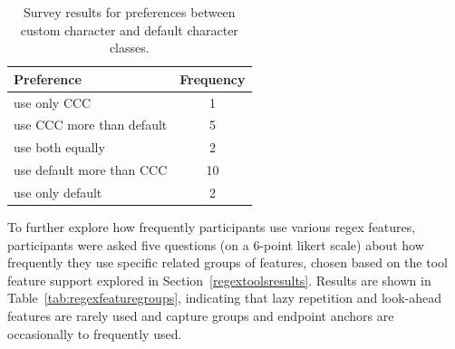 \begin{table}
\caption{Survey results for preferences between custom character and default character classes. \label{tab:cccvsdefault}}
\begin{center}
\begin{tabular}{l|c}
Preference & Frequency \\ \hline
use only CCC & 1\\
use CCC more than default & 5 \\
use both equally & 2\\
use default more than CCC & 10\\
use only default & 2\\

\end{tabular}
\end{center}
\end{table}

To further explore how frequently participants use various regex features, participants were asked five questions (on a 6-point likert scale) about how frequently they use specific related groups of features, 
chosen based on the tool feature support explored in Section~\ref{regextoolsresults}. 
Results are shown in Table~\ref{tab:regexfeaturegroups}, indicating that lazy repetition and look-ahead features are rarely used and capture groups and endpoint anchors are occasionally to frequently used. 

